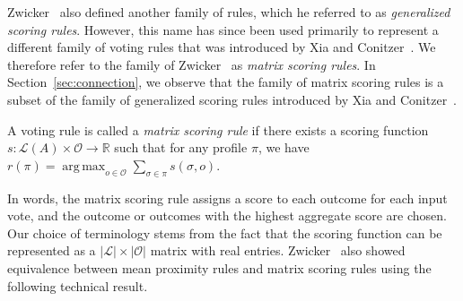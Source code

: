 \documentclass[prodmode]{acmsmall-ec14}
\newcommand{\calL}{{\mathcal{L}}}
\newcommand{\rank}{{\calL(A)}}
\newcommand{\calO}{{\mathcal{O}}}
\DeclareMathOperator*{\argmax}{arg\,max}
\DeclareMathOperator*{\argmin}{arg\,min}
\begin{document}
\noindent
Zwicker~ also defined another family of rules, which he referred to as \emph{generalized scoring rules}. However, this name has since been used primarily to represent a different family of voting rules that was introduced by Xia and Conitzer~. We therefore refer to the family of Zwicker~ as \emph{matrix scoring rules}. In Section~\ref{sec:connection}, we observe that the family of matrix scoring rules is a subset of the family of generalized scoring rules introduced by Xia and Conitzer~. 

\begin{definition}
A voting rule is called a \emph{matrix scoring rule} if there exists a scoring function $s : \rank \times \calO \rightarrow \mathbb{R}$ such that for any profile $\pi$, we have $r(\pi) = \argmax_{o \in \calO} \sum_{\sigma \in \pi} s(\sigma,o)$. 
\end{definition}



\noindent
In words, the matrix scoring rule assigns a score to each outcome for each input vote, and the outcome or outcomes with the highest aggregate score are chosen. Our choice of terminology stems from the fact that the scoring function can be represented as a $|\calL| \times |\calO|$ matrix with real entries. Zwicker~ also showed equivalence between mean proximity rules and matrix scoring rules using the following technical result. %
\end{document}
